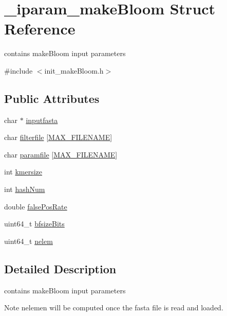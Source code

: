 \hypertarget{struct__iparam__makeBloom}{\section{\+\_\+iparam\+\_\+make\+Bloom Struct Reference}
\label{struct__iparam__makeBloom}
}


contains make\+Bloom input parameters  




{\ttfamily \#include $<$init\+\_\+make\+Bloom.\+h$>$}

\subsection*{Public Attributes}
\begin{DoxyCompactItemize}
\item 
char $\ast$ \hyperlink{struct__iparam__makeBloom_aaefb007647f548e8f3ffcb5fc83b7040}{inputfasta}
\item 
char \hyperlink{struct__iparam__makeBloom_aa3f7d0ba452807285408a70afbb5947b}{filterfile} \mbox{[}\hyperlink{defines_8h_abe0ec333b60117063f9b9fd9f849cb08}{M\+A\+X\+\_\+\+F\+I\+L\+E\+N\+A\+M\+E}\mbox{]}
\item 
char \hyperlink{struct__iparam__makeBloom_a8cf429229a99acfab0ce48046f42dfac}{paramfile} \mbox{[}\hyperlink{defines_8h_abe0ec333b60117063f9b9fd9f849cb08}{M\+A\+X\+\_\+\+F\+I\+L\+E\+N\+A\+M\+E}\mbox{]}
\item 
int \hyperlink{struct__iparam__makeBloom_a6f25cccf64d8ccdad252dcc1a99f0015}{kmersize}
\item 
int \hyperlink{struct__iparam__makeBloom_a0e8c97b918d06b17856569ede06bb2d9}{hash\+Num}
\item 
double \hyperlink{struct__iparam__makeBloom_a45fea7e1c00758d18e42f92c3ec9e29e}{false\+Pos\+Rate}
\item 
uint64\+\_\+t \hyperlink{struct__iparam__makeBloom_a8a0dac58ee8e9f1d8b29be730a5205a8}{bfsize\+Bits}
\item 
uint64\+\_\+t \hyperlink{struct__iparam__makeBloom_aad19a452126dca34f78bb961dc4cf233}{nelem}
\end{DoxyCompactItemize}


\subsection{Detailed Description}
contains make\+Bloom input parameters 

\begin{DoxyNote}{Note}
nelemen will be computed once the fasta file is read and loaded. 
\end{DoxyNote}


